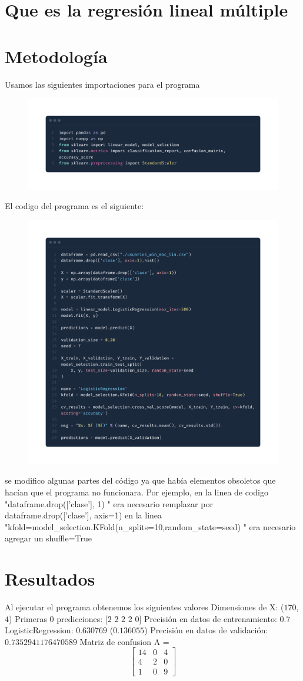 \section{Que es la regresión lineal múltiple}


\section{Metodología}
Usamos las siguientes importaciones para el programa
\begin{figure}[h]
    \centering
    \includegraphics[width=0.5\linewidth]{image.png}
\end{figure}
El codigo del programa es el siguiente:
\begin{figure}[h]
    \centering
    \includegraphics[width=0.5\linewidth]{image_2.png}
\end{figure}

se modifico algunas partes del código ya que había elementos obsoletos que hacían que el programa no funcionara.
Por ejemplo, en la linea de codigo "dataframe.drop(['clase'], 1) " era necesario remplazar por dataframe.drop(['clase'], axis=1) 
en la linea "kfold=model\_selection.KFold(n\_splits=10,random\_state=seed) " era necesario agregar  un shuffle=True


\section{Resultados}
Al ejecutar el programa obtenemos los siguientes valores
Dimensiones de X: ($170$, $4$)
Primeras $0$ predicciones: [$2$ $2$ $2$ $2$ $0$]
Precisión en datos de entrenamiento: $0.7$
LogisticRegression: $0.630769$ ($0.136055$)
Precisión en datos de validación: $0.7352941176470589$
Matriz de confusion
A = 
$$\begin{bmatrix}
14 & 0 & 4 \\
4 & 2 & 0 \\
1 & 0 & 9
\end{bmatrix}$$


